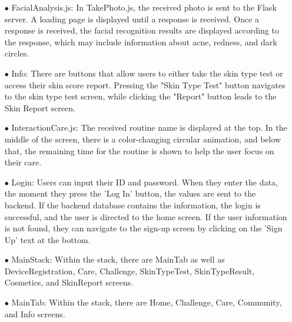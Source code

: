 \documentclass[conference]{IEEEtran}
\begin{document}
\begin{itemize}
\begin{itemize}
    \item[$\bullet$] FacialAnalysis.js: In TakePhoto.js, the received photo is sent to the Flask server. A loading page is displayed until a response is received. Once a response is received, the facial recognition results are displayed according to the response, which may include information about acne, redness, and dark circles.
     \item[$\bullet$] Info: There are buttons that allow users to either take the skin type test or access their skin score report. Pressing the "Skin Type Test" button navigates to the skin type test screen, while clicking the "Report" button leads to the Skin Report screen.
    \item[$\bullet$] InteractionCare.js: The received routine name is displayed at the top. In the middle of the screen, there is a color-changing circular animation, and below that, the remaining time for the routine is shown to help the user focus on their care.
     \item[$\bullet$] Login: Users can input their ID and password. When they enter the data, the moment they press the 'Log In' button, the values are sent to the backend. If the backend database contains the information, the login is successful, and the user is directed to the home screen. If the user information is not found, they can navigate to the sign-up screen by clicking on the 'Sign Up' text at the bottom.
   
    
    \item[$\bullet$] MainStack: Within the stack, there are MainTab as well as DeviceRegistration, Care, Challenge, SkinTypeTest, SkinTypeResult, Cosmetics, and SkinReport screens.
    \item[$\bullet$] MainTab: Within the stack, there are Home, Challenge, Care, Community, and Info screens.
    

\end{itemize}
\end{itemize}
\end{document}
